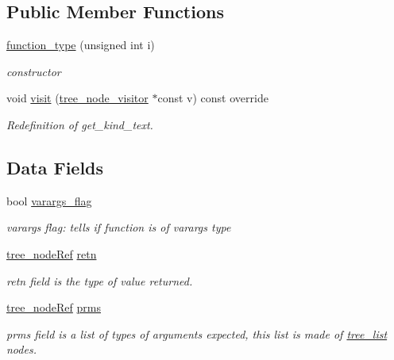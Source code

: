 \subsection*{Public Member Functions}
\begin{DoxyCompactItemize}
\item 
\hyperlink{structfunction__type_a9e27d80b9aea8a3f1093ba631d0b054f}{function\+\_\+type} (unsigned int i)
\begin{DoxyCompactList}\small\item\em constructor \end{DoxyCompactList}\item 
void \hyperlink{structfunction__type_a7cfe2e272e5280c9c280b180e3a21c2b}{visit} (\hyperlink{classtree__node__visitor}{tree\+\_\+node\+\_\+visitor} $\ast$const v) const override
\begin{DoxyCompactList}\small\item\em Redefinition of get\+\_\+kind\+\_\+text. \end{DoxyCompactList}\end{DoxyCompactItemize}
\subsection*{Data Fields}
\begin{DoxyCompactItemize}
\item 
bool \hyperlink{structfunction__type_a771f667b1830585df47dafaee5e485b2}{varargs\+\_\+flag}
\begin{DoxyCompactList}\small\item\em varargs flag\+: tells if function is of varargs type \end{DoxyCompactList}\item 
\hyperlink{tree__node_8hpp_a6ee377554d1c4871ad66a337eaa67fd5}{tree\+\_\+node\+Ref} \hyperlink{structfunction__type_a35e99bb540c752172fe404d698683a98}{retn}
\begin{DoxyCompactList}\small\item\em retn field is the type of value returned. \end{DoxyCompactList}\item 
\hyperlink{tree__node_8hpp_a6ee377554d1c4871ad66a337eaa67fd5}{tree\+\_\+node\+Ref} \hyperlink{structfunction__type_aa866f49264d4ebe75f63ec0db068b4d2}{prms}
\begin{DoxyCompactList}\small\item\em prms field is a list of types of arguments expected, this list is made of \hyperlink{structtree__list}{tree\+\_\+list} nodes. \end{DoxyCompactList}\end{DoxyCompactItemize}

